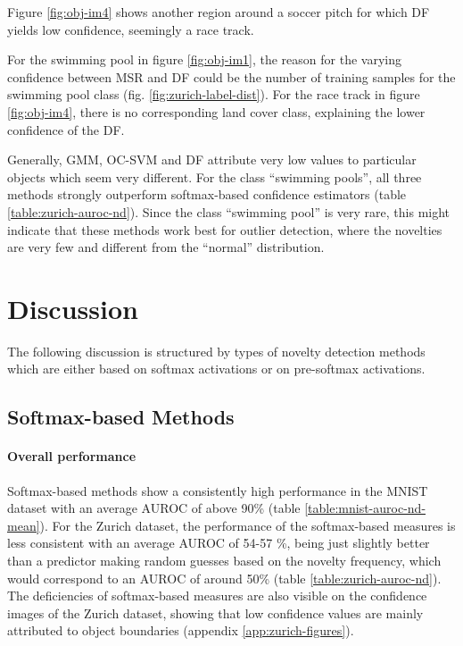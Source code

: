 \documentclass[10pt]{article}
\begin{document}
Figure \ref{fig:obj-im4} shows another region around a soccer pitch for which \gls{DF} yields low confidence, seemingly a race track.


For the swimming pool in figure \ref{fig:obj-im1}, the reason for the varying confidence between MSR and \acrlong{DF} could be the number of training samples for the swimming pool class (fig. \ref{fig:zurich-label-dist}). For the race track in figure \ref{fig:obj-im4}, there is no corresponding land cover class, explaining the lower confidence of the \acrlong{DF}. 

Generally, \gls{GMM}, \gls{OC-SVM} and \gls{DF} attribute very low values to particular objects which seem very different. For the class ``swimming pools'', all three methods strongly outperform softmax-based confidence estimators (table \ref{table:zurich-auroc-nd}). Since the class ``swimming pool'' is very rare, this might indicate that these methods work best for outlier detection, where the novelties are very few and different from the ``normal'' distribution.

\section{Discussion}
\label{sec:discussion}

The following discussion is structured by types of novelty detection methods which are either based on softmax activations or on pre-softmax activations.

\subsection{Softmax-based Methods}
\paragraph{Overall performance}  Softmax-based methods show a consistently high performance in the \gls{MNIST} dataset with an average \gls{AUROC} of above 90\% (table \ref{table:mnist-auroc-nd-mean}). For the Zurich dataset, the performance of the softmax-based measures is less consistent with an average \gls{AUROC} of 54-57 \%, being just slightly better than a predictor making random guesses based on the novelty frequency, which would correspond to an \gls{AUROC} of around 50\% (table \ref{table:zurich-auroc-nd}). The deficiencies of softmax-based measures are also visible on the confidence images of the Zurich dataset, showing that low confidence values are mainly attributed to object boundaries (appendix \ref{app:zurich-figures}).
\end{document}
